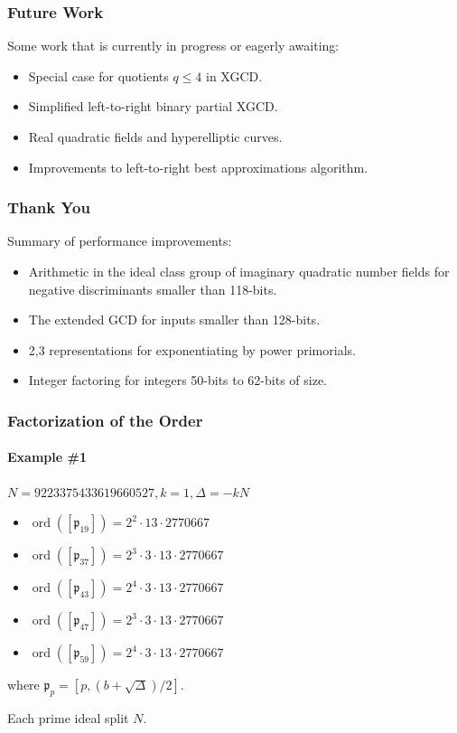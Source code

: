 \documentclass{beamer}
\DeclareMathOperator{\ord}{ord}
\newcommand{\ideal}{\mathfrak}
\newcommand{\idealclass}[1]{\left[ \ideal #1 \right]}
\begin{document}

\begin{frame}
\frametitle{Future Work}
Some work that is currently in progress or eagerly awaiting:
\begin{itemize}
\item Special case for quotients $q \le 4$ in XGCD.
\item Simplified left-to-right binary partial XGCD.
\item Real quadratic fields and hyperelliptic curves.
\item Improvements to left-to-right best approximations algorithm.
\end{itemize}
\end{frame}

\begin{frame}
\frametitle{Thank You}
Summary of performance improvements:
\begin{itemize}
\item Arithmetic in the ideal class group of imaginary quadratic number fields for negative discriminants smaller than 118-bits.
\item The extended GCD for inputs smaller than 128-bits.
\item 2,3 representations for exponentiating by power primorials.
\item Integer factoring for integers 50-bits to 62-bits of size.
\end{itemize}
\end{frame}



\begin{frame}
\frametitle{Factorization of the Order}
\framesubtitle{Example \#1}

$N = 9223375433619660527, k = 1, \Delta = -kN$
\begin{itemize}
\item $\ord(\idealclass{p_{19}}) = 2^2 \cdot 13 \cdot 2770667$
\item $\ord(\idealclass{p_{37}}) = 2^3 \cdot 3 \cdot 13 \cdot 2770667$
\item $\ord(\idealclass{p_{43}}) = 2^4 \cdot 3 \cdot 13 \cdot 2770667$
\item $\ord(\idealclass{p_{47}}) = 2^3 \cdot 3 \cdot 13 \cdot 2770667$
\item $\ord(\idealclass{p_{59}}) = 2^4 \cdot 3 \cdot 13 \cdot 2770667$
\end{itemize}

where $\ideal p_p = [p, (b + \sqrt\Delta)/2]$.

\bigskip
Each prime ideal split $N$.

\end{frame}
\end{document}
